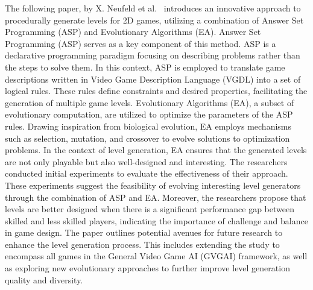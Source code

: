\documentclass[runningheads]{llncs}
\begin{document}
The following paper, by X. Neufeld et al.~\cite{ref_article17} introduces an innovative approach to procedurally generate levels for 2D games, utilizing a combination of Answer Set Programming (ASP) and Evolutionary Algorithms (EA). Answer Set Programming (ASP) serves as a key component of this method. ASP is a declarative programming paradigm focusing on describing problems rather than the steps to solve them. In this context, ASP is employed to translate game descriptions written in Video Game Description Language (VGDL) into a set of logical rules. These rules define constraints and desired properties, facilitating the generation of multiple game levels. Evolutionary Algorithms (EA), a subset of evolutionary computation, are utilized to optimize the parameters of the ASP rules. Drawing inspiration from biological evolution, EA employs mechanisms such as selection, mutation, and crossover to evolve solutions to optimization problems. In the context of level generation, EA ensures that the generated levels are not only playable but also well-designed and interesting. The researchers conducted initial experiments to evaluate the effectiveness of their approach. These experiments suggest the feasibility of evolving interesting level generators through the combination of ASP and EA. Moreover, the researchers propose that levels are better designed when there is a significant performance gap between skilled and less skilled players, indicating the importance of challenge and balance in game design. The paper outlines potential avenues for future research to enhance the level generation process. This includes extending the study to encompass all games in the General Video Game AI (GVGAI) framework, as well as exploring new evolutionary approaches to further improve level generation quality and diversity.
\end{document}
